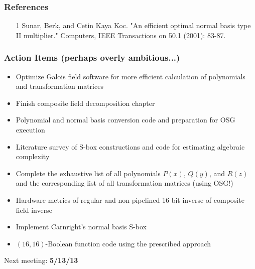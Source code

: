 \documentclass[handout]{beamer}
\begin{document}
\begin{frame}
	\frametitle{References}
	\begin{itemize}
		\item [1] Sunar, Berk, and Cetin Kaya Koc. "An efficient optimal normal basis type II multiplier." Computers, IEEE Transactions on 50.1 (2001): 83-87.
	\end{itemize}
\end{frame}

\begin{frame}
	\frametitle{Action Items (perhaps overly ambitious...)}
	\begin{itemize}
		\item Optimize Galois field software for more efficient calculation of polynomials and transformation matrices
		\item Finish composite field decomposition chapter
		\item Polynomial and normal basis conversion code and preparation for OSG execution
		\item Literature survey of S-box constructions and code for estimating algebraic complexity
		\item Complete the exhaustive list of all polynomials $P(x)$, $Q(y)$, and $R(z)$ and the 
		corresponding list of all transformation matrices (using OSG!)
		\item Hardware metrics of regular and non-pipelined 16-bit inverse of composite field inverse
		\item Implement Carnright's normal basis S-box 
		\item $(16,16)$-Boolean function code using the prescribed approach
	\end{itemize}
	\begin{center}
		Next meeting: \textbf{5/13/13}
	\end{center}
\end{frame}
\end{document}
